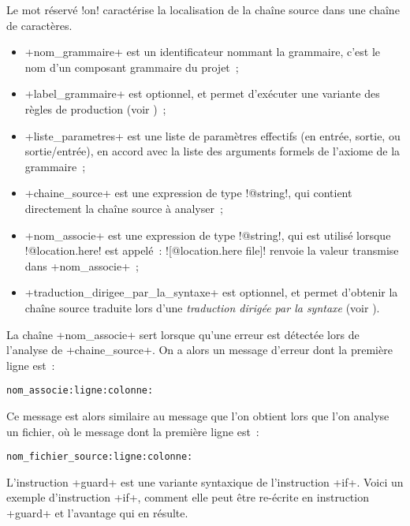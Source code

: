 Le mot réservé \ggst!on! caractérise la localisation de la chaîne source dans une chaîne de caractères.
\begin{itemize}
  \item \ggst+nom_grammaire+ est un identificateur nommant la grammaire, c'est le nom d'un composant grammaire du projet~;
  \item \ggst+label_grammaire+ est optionnel, et permet d'exécuter une variante des règles de production (voir )~;
  \item \ggst+liste_parametres+ est une liste de paramètres effectifs (en entrée, sortie, ou sortie/entrée), en accord avec la liste des arguments formels de l'axiome de la grammaire~;
  \item \ggst+chaine_source+ est une expression de type \ggst!@string!, qui contient directement la chaîne source à analyser~;
  \item \ggst+nom_associe+ est une expression de type \ggst!@string!, qui est utilisé lorsque \ggst!@location.here! est appelé~: \ggst![@location.here file]! renvoie la valeur transmise dans \ggst+nom_associe+~;
  \item \ggst+traduction_dirigee_par_la_syntaxe+ est optionnel, et permet d'obtenir la chaîne source traduite lors d'une \emph{traduction dirigée par la syntaxe} (voir ).
\end{itemize}



La chaîne \ggst+nom_associe+ sert lorsque qu'une erreur est détectée lors de l'analyse de \ggst+chaine_source+. On a alors un message d'erreur dont la première ligne est~:

\texttt{nom\_associe:ligne:colonne:}

Ce message est alors similaire au message que l'on obtient lors que l'on analyse un fichier, où le message dont la première ligne est~:

\texttt{nom\_fichier\_source:ligne:colonne:}















L'instruction \ggsq+guard+ est une variante syntaxique de l'instruction \ggsq+if+. Voici un exemple d'instruction \ggsq+if+, comment elle peut être re-écrite en instruction \ggsq+guard+ et l'avantage qui en résulte.

